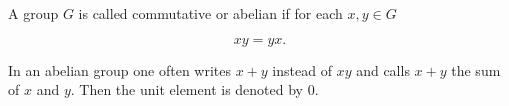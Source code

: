 A group $G$ is called commutative or abelian if for each $x, y \in G$

$$xy = yx.$$

In an abelian group one often writes $x + y$ instead of $xy$ and calls $x + y$ the sum of $x$ and $y$. Then the unit element is denoted by $0$.
